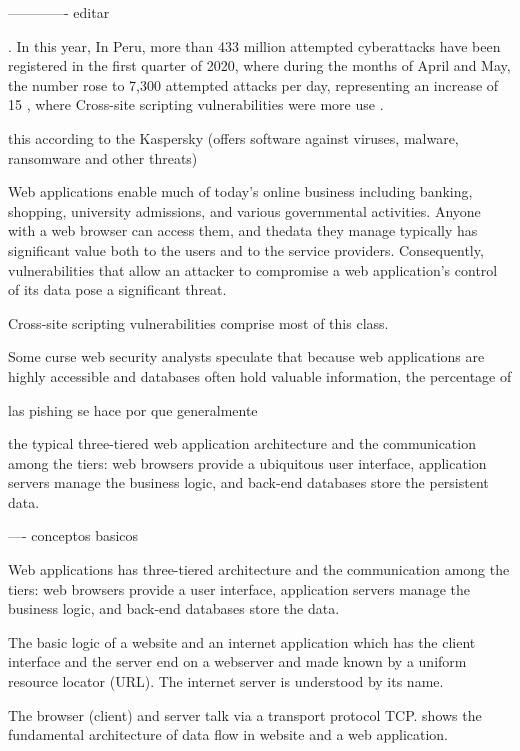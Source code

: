 \documentclass[12pt]{article}
\begin{document}
-------------
editar

. In this year, 
In Peru, more than 433 million attempted cyberattacks have been registered in the first quarter of 2020, where during the months of April and May, the number rose to 7,300 attempted attacks per day, representing an increase of 15%
, where  Cross-site scripting   vulnerabilities were more use .

this  according to the 
Kaspersky (offers software against viruses, malware, ransomware and other threats)


Web applications enable much of today’s online business including
banking, shopping, university admissions, and various governmental activities. Anyone with a web browser can access them, and thedata they manage typically has significant value both to the users and to the service providers. Consequently, vulnerabilities that allow an attacker to compromise a web application’s control of its data pose a significant threat.

Cross-site scripting  vulnerabilities 
 comprise most of this class. 



 Some curse
web security analysts speculate that because web applications are
highly accessible and databases often hold valuable information,
the percentage of 



las pishing se hace por que generalmente


 the typical three-tiered web application architecture
and  the communication among the tiers: web browsers provide a ubiquitous user interface, application servers manage the
business logic, and back-end databases store the persistent data.




----
conceptos basicos 


Web applications has 
three-tiered  architecture
and  the communication among the tiers: web browsers provide a  user interface, application servers manage the
business logic, and back-end databases store the  data.

The basic  logic of a website and an internet application which has the client interface and the server end on a webserver and made known by a uniform
resource locator (URL). 
The internet server is understood by
its name. 


The browser (client) and server talk via a transport
protocol TCP.  shows the fundamental architecture of
data flow in website and a web application.
\end{document}
